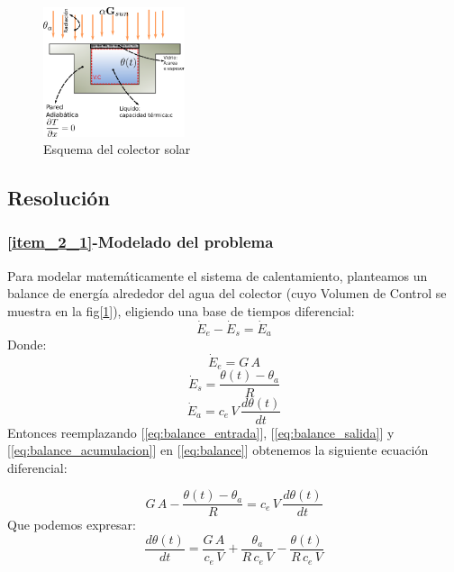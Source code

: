 \begin{figure}[H]
   \centering
   \includegraphics[width=0.37\textwidth]{Images/colector_esquema.eps}
   \caption{Esquema del colector solar}\label{fig:colector_esquema}
\end{figure}
\subsection{Resolución}
\subsubsection{\ref{item_2_1}-Modelado del problema}
Para modelar matemáticamente el sistema de calentamiento, planteamos un balance de energía alrededor
del agua del colector (cuyo Volumen de Control se muestra en la fig[\ref{fig:colector_esquema}]),
eligiendo una base de tiempos diferencial:
\begin{equation}
   \dot{E}_{e} - \dot{E}_{s}=\dot{E}_{a}\label{eq:balance}
\end{equation}
Donde:
\begin{equation}
   \dot{E}_{e} = G\,A\label{eq:balance_entrada}
\end{equation}
\begin{equation}
   \dot{E}_{s} = \dfrac{\theta(t) - \theta_{a}}{R}\label{eq:balance_salida}
\end{equation}
\begin{equation}
   \dot{E}_{a} = c_{e}\,V\,\dfrac{d\theta(t)}{dt}\label{eq:balance_acumulacion}
\end{equation}
Entonces reemplazando [\ref{eq:balance_entrada}], [\ref{eq:balance_salida}] y
[\ref{eq:balance_acumulacion}] en [\ref{eq:balance}] obtenemos la siguiente ecuación diferencial:

\begin{equation}
   G\,A - \dfrac{\theta(t) - \theta_{a}}{R} = c_{e}\,V\,\dfrac{d\theta(t)}{dt}\label{eq:balance_completo}
\end{equation}
Que podemos expresar:
\begin{equation}
   \dfrac{d\theta(t)}{dt} = \dfrac{G\,A}{c_{e}\,V} + \dfrac{\theta_{a}}{R\,c_{e}\,V} - \dfrac{\theta(t)}{R\,c_{e}\,V}
   \label{eq:modelo_problema2}
\end{equation}
